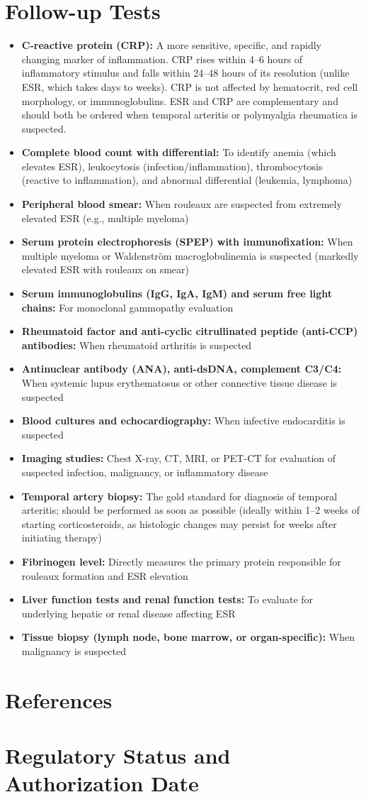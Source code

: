 \section*{Follow-up Tests}
\begin{itemize}
  \item \textbf{C-reactive protein (CRP):} A more sensitive, specific, and rapidly changing marker of inflammation. CRP rises within 4--6 hours of inflammatory stimulus and falls within 24--48 hours of its resolution (unlike ESR, which takes days to weeks). CRP is not affected by hematocrit, red cell morphology, or immunoglobulins. ESR and CRP are complementary and should both be ordered when temporal arteritis or polymyalgia rheumatica is suspected.
  \item \textbf{Complete blood count with differential:} To identify anemia (which elevates ESR), leukocytosis (infection/inflammation), thrombocytosis (reactive to inflammation), and abnormal differential (leukemia, lymphoma)
  \item \textbf{Peripheral blood smear:} When rouleaux are suspected from extremely elevated ESR (e.g., multiple myeloma)
  \item \textbf{Serum protein electrophoresis (SPEP) with immunofixation:} When multiple myeloma or Waldenstr\"{o}m macroglobulinemia is suspected (markedly elevated ESR with rouleaux on smear)
  \item \textbf{Serum immunoglobulins (IgG, IgA, IgM) and serum free light chains:} For monoclonal gammopathy evaluation
  \item \textbf{Rheumatoid factor and anti-cyclic citrullinated peptide (anti-CCP) antibodies:} When rheumatoid arthritis is suspected
  \item \textbf{Antinuclear antibody (ANA), anti-dsDNA, complement C3/C4:} When systemic lupus erythematosus or other connective tissue disease is suspected
  \item \textbf{Blood cultures and echocardiography:} When infective endocarditis is suspected
  \item \textbf{Imaging studies:} Chest X-ray, CT, MRI, or PET-CT for evaluation of suspected infection, malignancy, or inflammatory disease
  \item \textbf{Temporal artery biopsy:} The gold standard for diagnosis of temporal arteritis; should be performed as soon as possible (ideally within 1--2 weeks of starting corticosteroids, as histologic changes may persist for weeks after initiating therapy)
  \item \textbf{Fibrinogen level:} Directly measures the primary protein responsible for rouleaux formation and ESR elevation
  \item \textbf{Liver function tests and renal function tests:} To evaluate for underlying hepatic or renal disease affecting ESR
  \item \textbf{Tissue biopsy (lymph node, bone marrow, or organ-specific):} When malignancy is suspected
\end{itemize}

\section*{References}



\clearpage
\section*{Regulatory Status and Authorization Date}

\clearpage
